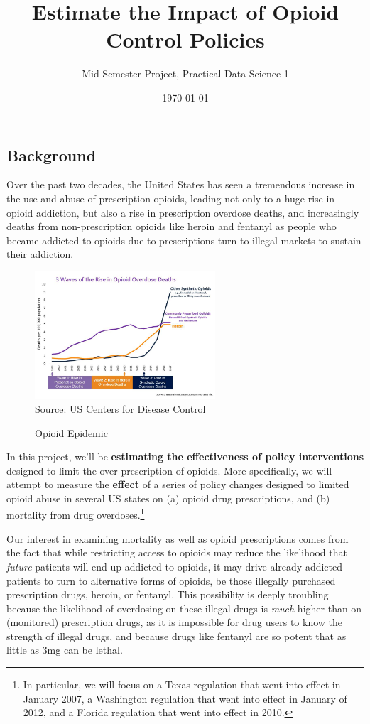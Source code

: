 \documentclass[12pt]{article}
\title{Estimate the Impact of Opioid Control Policies}
\author{Mid-Semester Project, Practical Data Science 1}
\date{\today}
\begin{document}
\maketitle

\subsection*{Background}

Over the past two decades, the United States has seen a tremendous increase in the use and abuse of prescription opioids, leading not only to a huge rise in opioid addiction, but also a rise in prescription overdose deaths, and increasingly deaths from non-prescription opioids like heroin and fentanyl as people who became addicted to opioids due to prescriptions turn to illegal markets to sustain their addiction.

\begin{figure}[h!]
  \centering
  \caption{Opioid Epidemic}\label{}
  \includegraphics[width=0.6\textwidth]{images/cdc_opioid_stats.png}\\
  \scriptsize{Source: US Centers for Disease Control}
\end{figure}

In this project, we'll be \textbf{estimating the effectiveness of policy interventions} designed to limit the over-prescription of opioids. More specifically, we will attempt to measure the \textbf{effect} of a series of policy changes designed to limited opioid abuse in several US states on (a) opioid drug prescriptions, and (b) mortality from drug overdoses.\footnote{ In particular, we will focus on a Texas regulation that went into effect in January 2007, a Washington regulation that went into effect in January of 2012, and a Florida regulation that went into effect in 2010.}

Our interest in examining mortality as well as opioid prescriptions comes from the fact that while restricting access to opioids may reduce the likelihood that \emph{future} patients will end up addicted to opioids, it may drive already addicted patients to turn to alternative forms of opioids, be those illegally purchased prescription drugs, heroin, or fentanyl. This possibility is deeply troubling because the likelihood of overdosing on these illegal drugs is \emph{much} higher than on (monitored) prescription drugs, as it is impossible for drug users to know the strength of illegal drugs, and because drugs like fentanyl are so potent that as little as 3mg can be lethal.
\end{document}
